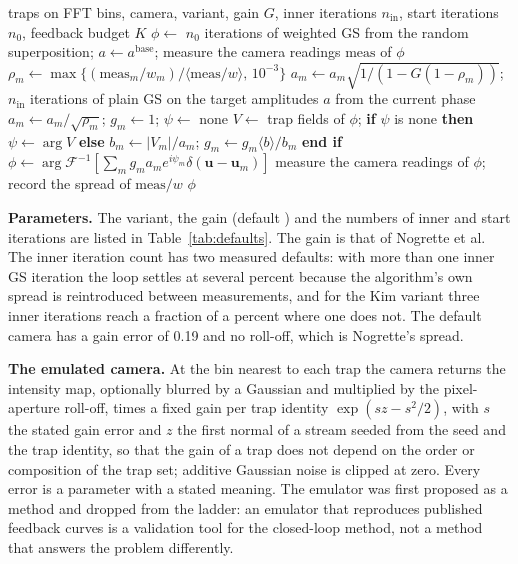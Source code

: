 \begin{algorithm}[t]
\caption{Closed-loop weighted GS on the emulated camera, the two variants (the cumulative reading of the Nogrette rule and the square-root rule of Kim); the history records the spread of the measured intensities.}
\label{alg:m12}
\begin{algorithmic}[1]
\Require traps on FFT bins, camera, variant, gain $G$, inner iterations $n_{\mathrm{in}}$, start iterations $n_0$, feedback budget $K$
\State $\phi\gets$ $n_0$ iterations of weighted GS from the random superposition; $a\gets a^{\mathrm{base}}$; measure the camera readings $\mathrm{meas}$ of $\phi$
  \State $\rho_m\gets\max\{(\mathrm{meas}_m/w_m)/\langle\mathrm{meas}/w\rangle,\,10^{-3}\}$
   \State $a_m\gets a_m\sqrt{1/(1-G(1-\rho_m))}$; $n_{\mathrm{in}}$ iterations of plain GS on the target amplitudes $a$ from the current phase
  \Else \State $a_m\gets a_m/\sqrt{\rho_m}$; $g_m\gets1$; $\psi\gets$ none
      \State $V\gets$ trap fields of $\phi$; \textbf{if} $\psi$ is none \textbf{then} $\psi\gets\arg V$ \textbf{else} $b_m\gets|V_m|/a_m$; $g_m\gets g_m\langle b\rangle/b_m$ \textbf{end if}
      \State $\phi\gets\arg\mathcal F^{-1}[\sum_m g_ma_me^{i\psi_m}\delta(\mathbf u-\mathbf u_m)]$
    \EndFor
  \EndIf
  \State measure the camera readings of $\phi$; record the spread of $\mathrm{meas}/w$
\EndFor
\State \Return $\phi$
\end{algorithmic}
\end{algorithm}

\textbf{Parameters.} The variant, the gain (default ) and the numbers of inner and start iterations are listed in Table~\ref{tab:defaults}. The gain is that of Nogrette et al. The inner iteration count has two measured defaults: with more than one inner GS iteration the loop settles at several percent because the algorithm's own spread is reintroduced between measurements, and for the Kim variant three inner iterations reach a fraction of a percent where one does not. The default camera has a gain error of 0.19 and no roll-off, which is Nogrette's spread.

\textbf{The emulated camera.} At the bin nearest to each trap the camera returns the intensity map, optionally blurred by a Gaussian and multiplied by the pixel-aperture roll-off, times a fixed gain per trap identity $\exp(sz-s^2/2)$, with $s$ the stated gain error and $z$ the first normal of a stream seeded from the seed and the trap identity, so that the gain of a trap does not depend on the order or composition of the trap set; additive Gaussian noise is clipped at zero. Every error is a parameter with a stated meaning. The emulator was first proposed as a method and dropped from the ladder: an emulator that reproduces published feedback curves is a validation tool for the closed-loop method, not a method that answers the problem differently.

